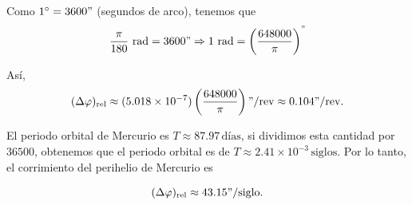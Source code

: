 \documentclass[letterpaper,11pt]{article}
\newcommand{\grad}{^\circ}
\begin{document}
Como $1\grad = 3600"$ (segundos de arco), tenemos que
\begin{equation}
\frac{\pi}{180} \ \text{rad} = 3600" \Rightarrow 1 \ \text{rad} = \left(\frac{648000}{\pi}\right)^{"}
\end{equation}

Así, 
\begin{equation}
(\Delta \varphi)_{\text{rel}} \approx (5.018 \times 10^{-7}) \left( \frac{648000}{\pi}\right) "/\text{rev} \approx 0.104 "/\text{rev}. 
\end{equation}

El periodo orbital de Mercurio es $T \approx 87.97 \,\text{días}$, si dividimos esta cantidad por $36500$, obtenemos que el periodo orbital es de $T \approx 2.41 \times 10^{-3} \,\text{siglos}$. Por lo tanto, el corrimiento del perihelio de Mercurio es 
\begin{shaded}
\begin{equation}
(\Delta \varphi)_{\text{rel}}  \approx 43.15 " / \text{siglo}.
\end{equation}
\end{shaded}
\end{document}

